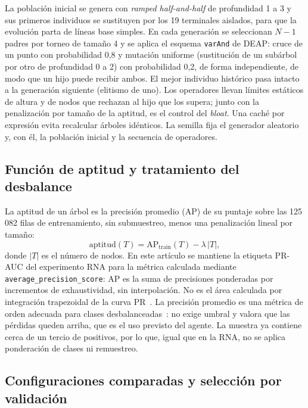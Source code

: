 \documentclass[conference]{IEEEtran}
\begin{document}
La población inicial se genera con \textit{ramped half-and-half} de
profundidad 1 a 3 y sus primeros individuos se sustituyen por los 19
terminales aislados, para que la evolución parta de líneas base simples. En
cada generación se seleccionan $N-1$ padres por torneo de tamaño 4 y se
aplica el esquema \texttt{varAnd} de DEAP: cruce de un punto con probabilidad
0,8 y mutación uniforme (sustitución de un subárbol por otro de profundidad
0 a 2) con probabilidad 0,2, de forma independiente, de modo que un hijo puede
recibir ambos. El mejor individuo histórico pasa intacto a la generación
siguiente (elitismo de uno). Los operadores llevan límites estáticos de altura
y de nodos que rechazan al hijo que los supera; junto con la penalización por
tamaño de la aptitud, es el control del \textit{bloat}. Una caché por
expresión evita recalcular árboles idénticos. La semilla fija el generador
aleatorio y, con él, la población inicial y la secuencia de operadores.

\subsection{Función de aptitud y tratamiento del desbalance}

La aptitud de un árbol es la precisión promedio (AP) de su puntaje sobre
las 125\,082 filas de entrenamiento, sin submuestreo, menos una penalización
lineal por tamaño:
\begin{equation}
\mathrm{aptitud}(T) = \mathrm{AP}_{\mathrm{train}}(T) - \lambda\, |T|,
\end{equation}
donde $|T|$ es el número de nodos. En este artículo se mantiene la etiqueta
PR-AUC del experimento RNA para la métrica calculada mediante
\texttt{average\_precision\_score}: AP es la suma de precisiones ponderadas
por incrementos de exhaustividad, sin interpolación. No es el área calculada
por integración trapezoidal de la curva PR~\cite{sklearn_ap}. La precisión
promedio es una métrica de
orden adecuada para clases desbalanceadas~\cite{saito}: no exige umbral y
valora que las pérdidas queden arriba, que es el uso previsto del agente. La
muestra ya contiene cerca de un tercio de positivos, por lo que, igual que en
la RNA, no se aplica ponderación de clases ni remuestreo.

\subsection{Configuraciones comparadas y selección por validación}
\label{sec:seleccion}
\end{document}
